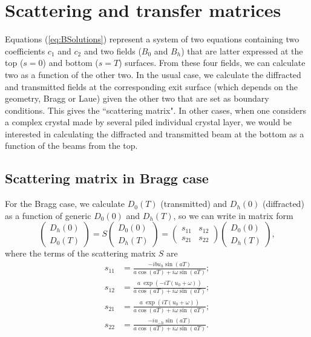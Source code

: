 \documentclass[preprint]{iucr}              %
\begin{document}
\section{Scattering and transfer matrices}
\label{sec:matrices}
Equations (\ref{eq:BSolutions}) represent a system of two equations containing two coefficients $c_1$ and $c_2$ and two fields ($B_0$ and $B_h$) that are latter expressed at the top ($s=0$) and bottom ($s=T$) surfaces. From these four fields, we can calculate two as a function of the other two. In the usual case, we calculate the diffracted and transmitted fields at the corresponding exit surface (which depends on the geometry, Bragg or Laue) given the other two that are set as boundary conditions. This gives the ``scattering matrix". In other cases, when one considers a complex crystal made by several piled individual crystal layer, we would be interested in calculating the diffracted and transmitted beam at the bottom as a function of the beams from the top.   

\subsection{Scattering matrix in Bragg case}
For the Bragg case, we calculate $D_0(T)$ (transmitted) and $D_h(0)$ (diffracted) as a function of generic $D_0(0)$ and $D_h(T)$, so we can write in matrix form
\begin{equation}
    \begin{pmatrix}
    D_h(0)\\
    D_0(T)
    \end{pmatrix}
    =
    S
        \begin{pmatrix}
    D_0(0) \\
    D_h(T)
    \end{pmatrix}
    =
    \begin{pmatrix}
    s_{11} & s_{12}\\
    s_{21} & s_{22}
    \end{pmatrix}
    \begin{pmatrix}
    D_0(0) \\
    D_h(T)
    \end{pmatrix},
\end{equation}
where the terms of the scattering matrix $S$ are 
\begin{subequations}\label{eq:scatteringMatrixBragg }
\begin{align}
s_{11} &= \frac{-i b u_h \sin(a T)}{a \cos(a T) + i \omega \sin(a T)};\\
s_{12} &= \frac{a~\exp(-i T (u_0+ \omega))}{a \cos(a T) + i \omega \sin(a T)};\\
s_{21} &= \frac{a~\exp(i T (u_0+ \omega))}{a \cos(a T) + i \omega \sin(a T)};\\
s_{22} &= \frac{-i u_{-h} \sin(a T)}{a \cos(a T) + i \omega \sin(a T)}.
\end{align}
\end{subequations}
\end{document}
